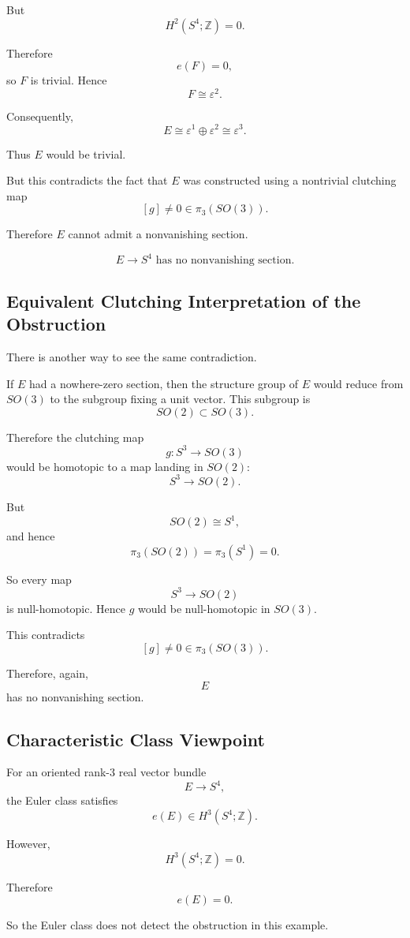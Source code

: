 \documentclass[12pt,a4paper]{article}
\theoremstyle{notespace}
\begin{document}
But
\[
H^2(S^4;\mathbb Z)=0.
\]

Therefore
\[
e(F)=0,
\]
so \(F\) is trivial. Hence
\[
F\cong \varepsilon^2.
\]

Consequently,
\[
E\cong \varepsilon^1\oplus \varepsilon^2
\cong \varepsilon^3.
\]

Thus \(E\) would be trivial.

But this contradicts the fact that \(E\) was constructed using a nontrivial clutching map
\[
[g]\neq 0\in \pi_3(SO(3)).
\]

Therefore \(E\) cannot admit a nonvanishing section.

\[
\boxed{
	E\to S^4 \text{ has no nonvanishing section.}
}
\]

\subsection{Equivalent Clutching Interpretation of the Obstruction}

There is another way to see the same contradiction.

If \(E\) had a nowhere-zero section, then the structure group of \(E\) would reduce from \(SO(3)\) to the subgroup fixing a unit vector. This subgroup is
\[
SO(2)\subset SO(3).
\]

Therefore the clutching map
\[
g:S^3\longrightarrow SO(3)
\]
would be homotopic to a map landing in \(SO(2)\):
\[
S^3\longrightarrow SO(2).
\]

But
\[
SO(2)\cong S^1,
\]
and hence
\[
\pi_3(SO(2))
=
\pi_3(S^1)
=
0.
\]

So every map
\[
S^3\to SO(2)
\]
is null-homotopic. Hence \(g\) would be null-homotopic in \(SO(3)\).

This contradicts
\[
[g]\neq 0\in \pi_3(SO(3)).
\]

Therefore, again,
\[
E
\]
has no nonvanishing section.

\subsection{Characteristic Class Viewpoint}

For an oriented rank-\(3\) real vector bundle
\[
E\to S^4,
\]
the Euler class satisfies
\[
e(E)\in H^3(S^4;\mathbb Z).
\]

However,
\[
H^3(S^4;\mathbb Z)=0.
\]

Therefore
\[
e(E)=0.
\]

So the Euler class does not detect the obstruction in this example.
\end{document}
